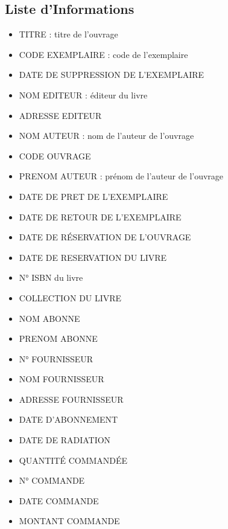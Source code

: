 \documentclass[a4paper,11pt]{article}
\begin{document}
\subsection{Liste d'Informations}
\begin{itemize}
    \item TITRE : titre de l'ouvrage
    \item CODE EXEMPLAIRE : code de l'exemplaire
    \item DATE DE SUPPRESSION DE L’EXEMPLAIRE
    \item NOM EDITEUR : éditeur du livre
    \item ADRESSE EDITEUR
    \item NOM AUTEUR : nom de l'auteur de l'ouvrage
    \item CODE OUVRAGE
    \item PRENOM AUTEUR : prénom de l'auteur de l'ouvrage
    \item DATE DE PRET DE L’EXEMPLAIRE
    \item DATE DE RETOUR DE L’EXEMPLAIRE
    \item DATE DE RÉSERVATION DE L'OUVRAGE
    \item DATE DE RESERVATION DU LIVRE
    \item N° ISBN du livre
    \item COLLECTION DU LIVRE
    \item NOM ABONNE
    \item PRENOM ABONNE
    \item N° FOURNISSEUR
    \item NOM FOURNISSEUR
    \item ADRESSE FOURNISSEUR
    \item DATE D'ABONNEMENT
    \item DATE DE RADIATION
    \item QUANTITÉ COMMANDÉE
    \item N° COMMANDE
    \item DATE COMMANDE
    \item MONTANT COMMANDE
\end{itemize}
\end{document}
